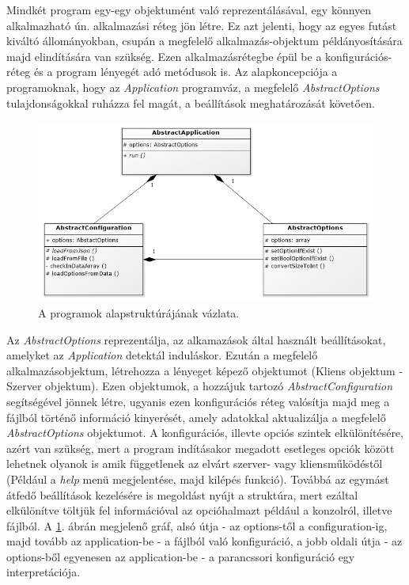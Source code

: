 \documentclass[12pt]{report}
\begin{document}
Mindkét program egy-egy objektumént való reprezentálásával, egy könnyen alkalmazható ún. alkalmazási réteg jön létre. Ez azt jelenti, hogy az egyes futást kiváltó állományokban, csupán a megfelelő alkalmazás-objektum példányosítására majd elindítására van szükség.
Ezen alkalmazásrétegbe épül be a konfigurációs-réteg és a program lényegét adó metódusok is. 
Az alapkoncepciója a programoknak, hogy az \textit{Application} programváz, a megfelelő \textit{AbstractOptions} tulajdonságokkal ruházza fel magát, a beállítások meghatározását követően.
     \begin{figure}[ht]
  \centering
    \includegraphics[width=15cm]{pics/abstracts.png}
	  \caption{A programok alapstruktúrájának vázlata.}
      \label{fig:abstract}
  \end{figure}
Az \textit{AbstractOptions} reprezentálja, az alkamazások által használt beállításokat, amelyket az \textit{Application} detektál induláskor. Ezután a megfelelő alkalmazásobjektum, létrehozza a lényeget képező objektumot (Kliens objektum - Szerver objektum). Ezen objektumok, a hozzájuk tartozó \textit{AbstractConfiguration} segítségével jönnek létre, ugyanis ezen konfigurációs réteg valósítja majd meg a fájlból történő információ kinyerését, amely adatokkal aktualizálja a megfelelő \textit{AbstractOptions} objektumot.
A konfigurációs, illevte opciós szintek elkülönítésére, azért van szükség, mert a program indításakor megadott esetleges opciók között lehetnek olyanok is amik függetlenek az elvárt szerver- vagy kliensműködéstől (Például a \textit{help} menü megjelentése, majd kilépés funkció). Továbbá az egymást átfedő beállítások kezelésére is megoldást nyújt a struktúra, mert ezáltal elkülönítve töltjük fel információval az opcióhalmazt például a konzolról, illetve fájlból.
A \ref{fig:abstract}. ábrán megjelenő gráf, alsó útja - az options-től a configuration-ig, majd tovább az application-be - a fájlból való konfiguráció, a jobb oldali útja - az options-ből egyenesen az application-be - a parancssori konfiguráció egy interpretációja.
\end{document}
